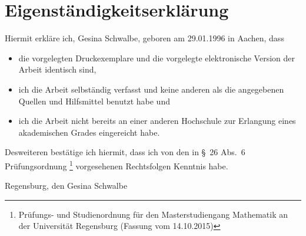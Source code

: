 % 


\chapter*{Eigenständigkeitserklärung}
\thispagestyle{empty}
Hiermit erkläre ich, Gesina Schwalbe, geboren am 29.01.1996 in Aachen,
dass
\begin{itemize}
\item die vorgelegten Druckexemplare und die vorgelegte elektronische
  Version der Arbeit identisch sind,
\item ich die Arbeit selbständig verfasst und keine anderen als die
  angegebenen Quellen und Hilfsmittel benutzt habe und
\item ich die Arbeit nicht bereits an einer anderen Hochschule zur
  Erlangung eines akademischen Grades eingereicht habe.
\end{itemize}
Desweiteren bestätige ich hiermit, dass ich von den in
§~26 Abs.~6 Prüfungsordnung%
\footnote{
  Prüfungs- und Studienordnung für den Masterstudiengang Mathematik an
  der Universität Regensburg (Fassung vom 14.10.2015)
}
vorgesehenen Rechtsfolgen Kenntnis habe.


\vspace*{5em}
Regensburg, den \handindate
\hfill
Gesina Schwalbe


